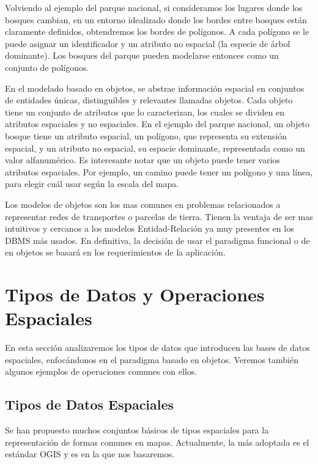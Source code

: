 Volviendo al ejemplo del parque nacional, si consideramos los lugares donde los bosques cambian,
en un entorno idealizado donde los bordes entre bosques están claramente definidos, obtendremos los bordes de polígonos.
A cada polígono se le puede asignar un identificador y un atributo no espacial (la especie de árbol dominante).
Los bosques del parque pueden modelarse entonces como un conjunto de polígonos.

En el modelado basado en objetos, se abstrae información espacial en conjuntos de
entidades únicas, distinguibles y relevantes llamadas objetos.
Cada objeto tiene un conjunto de atributos que lo caracterizan, los cuales se dividen en atributos espaciales y no espaciales.
En el ejemplo del parque nacional, un objeto bosque tiene un atributo espacial, un polígono, que representa su extensión espacial,
y un atributo no espacial, su espacie dominante, representada como un valor alfanumérico.
Es interesante notar que un objeto puede tener varios atributos espaciales.
Por ejemplo, un camino puede tener un polígono y una línea, para elegir cuál usar según la escala del mapa.

Los modelos de objetos son los mas comunes en problemas relacionados a representar redes de transportes o parcelas de tierra.
Tienen la ventaja de ser mas intuitivos y cercanos a los modelos Entidad-Relación ya muy presentes en los DBMS más usados.
En definitiva, la decisión de usar el paradigma funcional o de en objetos se basará en los requerimientos de la aplicación.

\section{Tipos de Datos y Operaciones Espaciales} \label{sec:s:sdt}

En esta sección analizaremos los tipos de datos que introducen las bases de datos espaciales, enfocándonos en el paradigma basado en objetos. Veremos también algunos ejemplos de operaciones comunes con ellos.

\subsection{Tipos de Datos Espaciales}

Se han propuesto muchos conjuntos básicos de tipos espaciales para la representación de formas comunes en mapas. Actualmente, la más adoptada es el estándar OGIS\textsuperscript{\cite{99opengis}} y es en la que nos basaremos.

